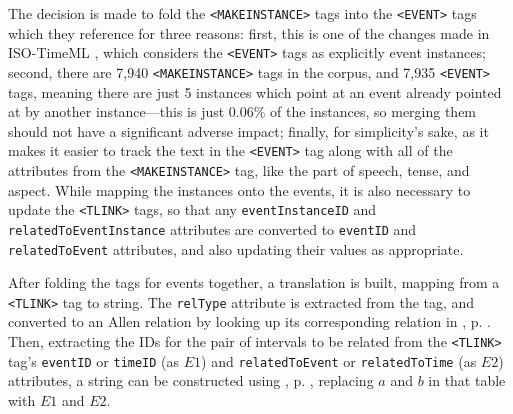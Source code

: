 \documentclass[a4paper,12pt,leqno]{article}
\begin{document}
The decision is made to fold the \verb|<MAKEINSTANCE>| tags into the \verb|<EVENT>| tags which they reference for three reasons: first, this is one of the changes made in ISO-TimeML \citep{pustejovsky2010iso}, which considers the \verb|<EVENT>| tags as explicitly event instances; second, there are 7,940 \verb|<MAKEINSTANCE>| tags in the corpus, and 7,935 \verb|<EVENT>| tags, meaning there are just 5 instances which point at an event already pointed at by another instance---this is just 0.06\% of the instances, so merging them should not have a significant adverse impact; finally, for simplicity's sake, as it makes it easier to track the text in the \verb|<EVENT>| tag along with all of the attributes from the \verb|<MAKEINSTANCE>| tag, like the part of speech, tense, and aspect. While mapping the instances onto the events, it is also necessary to update the \verb|<TLINK>| tags, so that any \verb|eventInstanceID| and \verb|relatedToEventInstance| attributes are converted to \verb|eventID| and \verb|relatedToEvent| attributes, and also updating their values as appropriate.

After folding the tags for events together, a translation is built, mapping from a \verb|<TLINK>| tag to string. The \verb|relType| attribute is extracted from the tag, and converted to an Allen relation by looking up its corresponding relation in , p. \pageref{fig:tlink-allen-translation}. Then, extracting the IDs for the pair of intervals to be related from the \verb|<TLINK>| tag's \verb|eventID| or \verb|timeID| (as $E1$) and \verb|relatedToEvent| or \verb|relatedToTime| (as $E2$) attributes, a string can be constructed using , p. \pageref{tab:allen-rels-strings}, replacing $a$ and $b$ in that table with $E1$ and $E2$.
\end{document}
